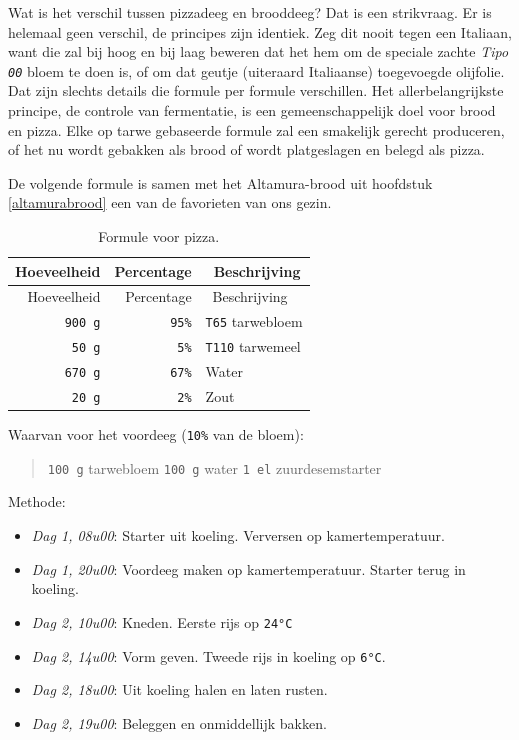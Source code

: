 \documentclass[
  11pt,
  dutch,
]{memoir}
\providecommand{\tightlist}{%
  \setlength{\itemsep}{0pt}\setlength{\parskip}{0pt}}
\begin{document}
Wat is het verschil tussen pizzadeeg en brooddeeg? Dat is een
strikvraag. Er is helemaal geen verschil, de principes zijn identiek.
Zeg dit nooit tegen een Italiaan, want die zal bij hoog en bij laag
beweren dat het hem om de speciale zachte \emph{Tipo \texttt{00}} bloem
te doen is, of om dat geutje (uiteraard Italiaanse) toegevoegde
olijfolie. Dat zijn slechts details die formule per formule verschillen.
Het allerbelangrijkste principe, de controle van fermentatie, is een
gemeenschappelijk doel voor brood en pizza. Elke op tarwe gebaseerde
formule zal een smakelijk gerecht produceren, of het nu wordt gebakken
als brood of wordt platgeslagen en belegd als pizza.

De volgende formule is samen met het Altamura-brood uit hoofdstuk
\ref{altamurabrood} een van de favorieten van ons gezin.

\begin{longtable}[]{@{}rrl@{}}
\caption{Formule voor pizza.\label{pizzaformule}}\tabularnewline
\toprule
Hoeveelheid & Percentage & ~Beschrijving\tabularnewline
\midrule
\endfirsthead
\toprule
Hoeveelheid & Percentage & ~Beschrijving\tabularnewline
\midrule
\endhead
\texttt{900\ g} & \texttt{95\%} & \texttt{T65} tarwebloem\tabularnewline
\texttt{50\ g} & \texttt{5\%} & \texttt{T110} tarwemeel\tabularnewline
\texttt{670\ g} & \texttt{67\%} & Water\tabularnewline
\texttt{20\ g} & \texttt{2\%} & Zout\tabularnewline
\bottomrule
\end{longtable}

Waarvan voor het voordeeg (\texttt{10\%} van de bloem):

\begin{quote}
\texttt{100\ g} tarwebloem \newline \texttt{100\ g} water \newline
\texttt{1\ el} zuurdesemstarter
\end{quote}

Methode:

\begin{itemize}
\tightlist
\item
  \emph{Dag 1, 08u00}: Starter uit koeling. Verversen op
  kamertemperatuur.
\item
  \emph{Dag 1, 20u00}: Voordeeg maken op kamertemperatuur. Starter terug
  in koeling.
\item
  \emph{Dag 2, 10u00}: Kneden. Eerste rijs op \texttt{24°C}
\item
  \emph{Dag 2, 14u00}: Vorm geven. Tweede rijs in koeling op
  \texttt{6°C}.
\item
  \emph{Dag 2, 18u00}: Uit koeling halen en laten rusten.
\item
  \emph{Dag 2, 19u00}: Beleggen en onmiddellijk bakken.
\end{itemize}
\end{document}
